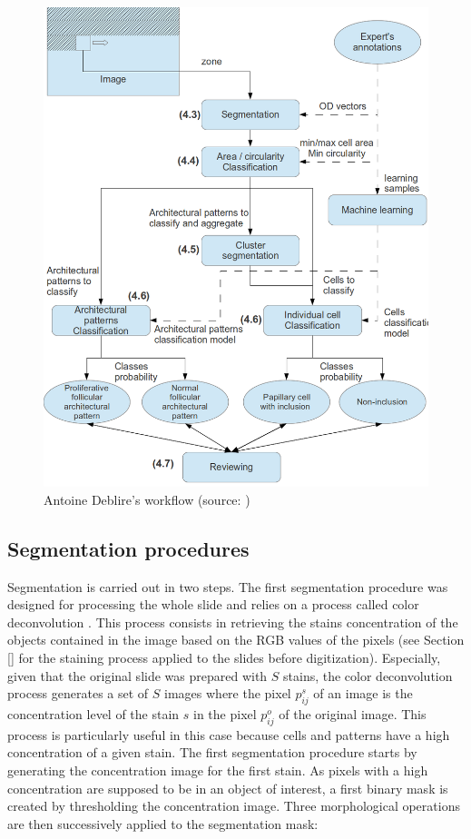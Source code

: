 \begin{figure}
	\center
	\includegraphics[scale=0.95]{image/adeblire_workflow.png}
	\caption{Antoine Deblire's workflow (source: \cite{adeblire2013})}
	\label{fig:workflow_adeblire}
\end{figure}

\subsection{Segmentation procedures}
\label{ssec:segmentation_proc}
Segmentation is carried out in two steps. The first segmentation procedure was designed for processing the whole slide and relies on a process called color deconvolution \cite{ruifrok2001quantification}. This process consists in retrieving the stains concentration of the objects contained in the image based on the RGB values of the pixels (see Section \ref{} for the staining process applied to the slides before digitization). Especially, given that the original slide was prepared with $S$ stains, the color deconvolution process generates a set of $S$ images where the pixel $p^s_{ij}$ of an image is the concentration level of the stain $s$ in the pixel $p^o_{ij}$ of the original image. This process is particularly useful in this case because cells and patterns have a high concentration of a given stain. The first segmentation procedure starts by generating the concentration image for the first stain. As pixels with a high concentration are supposed to be in an object of interest, a first binary mask is created by thresholding the concentration image. Three morphological operations are then successively applied to the segmentation mask:

